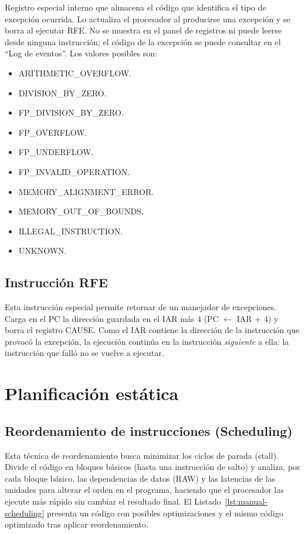 \documentclass[../main.tex]{subfiles}
\begin{document}
Registro especial interno que almacena el código que identifica el tipo de excepción ocurrida. Lo actualiza el procesador al producirse una excepción y se borra al ejecutar RFE. No se muestra en el panel de registros ni puede leerse desde ninguna instrucción; el código de la excepción se puede consultar en el ``Log de eventos''. Los valores posibles son:
\begin{itemize}
	\item ARITHMETIC\_OVERFLOW.
	\item DIVISION\_BY\_ZERO.
	\item FP\_DIVISION\_BY\_ZERO.
	\item FP\_OVERFLOW.
	\item FP\_UNDERFLOW.
	\item FP\_INVALID\_OPERATION.
	\item MEMORY\_ALIGNMENT\_ERROR.
	\item MEMORY\_OUT\_OF\_BOUNDS.
	\item ILLEGAL\_INSTRUCTION.
	\item UNKNOWN.
\end{itemize}

\subsection{Instrucción RFE}

Esta instrucción especial permite retornar de un manejador de excepciones. Carga en el PC la dirección guardada en el IAR más 4 (PC $\leftarrow$ IAR + 4) y borra el registro CAUSE. Como el IAR contiene la dirección de la instrucción que provocó la excepción, la ejecución continúa en la instrucción \emph{siguiente} a ella: la instrucción que falló no se vuelve a ejecutar.

\section{Planificación estática}

\subsection{Reordenamiento de instrucciones (Scheduling)}

Esta técnica de reordenamiento busca minimizar los ciclos de parada (stall). Divide el código en bloques básicos (hasta una instrucción de salto) y analiza, por cada bloque básico, las dependencias de datos (RAW) y las latencias de las unidades para alterar el orden en el programa, haciendo que el procesador las ejecute más rápido sin cambiar el resultado final. El Listado~\ref{lst:manual-scheduling} presenta un código con posibles optimizaciones y el mismo código optimizado tras aplicar reordenamiento.
\end{document}
